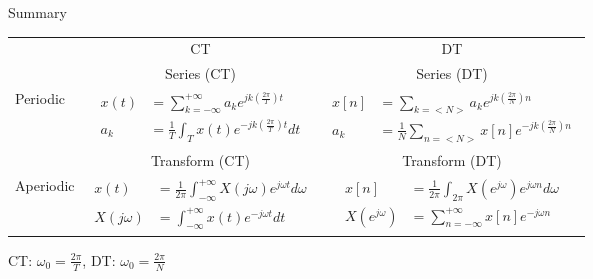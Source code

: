 \begin{frame}{Summary}
\centering
{%
    \begin{tabular}{lcc}

    & CT & DT\\
        \cline{2-3}
    & Series (CT) & Series (DT)\\
    \cline{2-3}
    Periodic &
    $\begin{aligned}
        x(t) &= \sum_{k=-\infty}^{+\infty}a_k e^{jk\left(\frac{2\pi}{T}\right)t}\\
        a_k &= \frac{1}{T} \int_{T}x(t)e^{-jk\left(\frac{2\pi}{T}\right) t}dt
    \end{aligned}$\par

    &
    $\begin{aligned}
        x[n] &= \sum_{k=<N>}a_k e^{jk\left(\frac{2\pi}{N}\right) n}\\
        a_k &= \frac{1}{N} \sum_{n=<N>}x[n]e^{-jk\left(\frac{2\pi}{N}\right)n}
    \end{aligned}$\par
    \\[4ex]
        \cline{2-3}
     & Transform (CT) & Transform (DT)\\
    \cline{2-3}
    Aperiodic &
    $\begin{aligned}
        x(t) &= \frac{1}{2\pi}\int_{-\infty}^{+\infty} X(j\omega)e^{j\omega t}d\omega\\
        X(j\omega) &=  \int_{-\infty}^{+\infty}x(t)e^{-j\omega t}dt
    \end{aligned}$\par

    &


    $\begin{aligned}
        x[n] &= \frac{1}{2\pi}\int_{2\pi} X(e^{j\omega})e^{j\omega n}d\omega\\
        X(e^{j\omega}) &= \sum_{n=-\infty}^{+\infty}x[n]e^{-j\omega n}
    \end{aligned}$\par
    \\[4ex]
        \cline{2-3}
    \end{tabular}
    }

    CT: $\omega_0 = \frac{2\pi}{T}$, DT: $\omega_0 = \frac{2\pi}{N}$

\end{frame}

